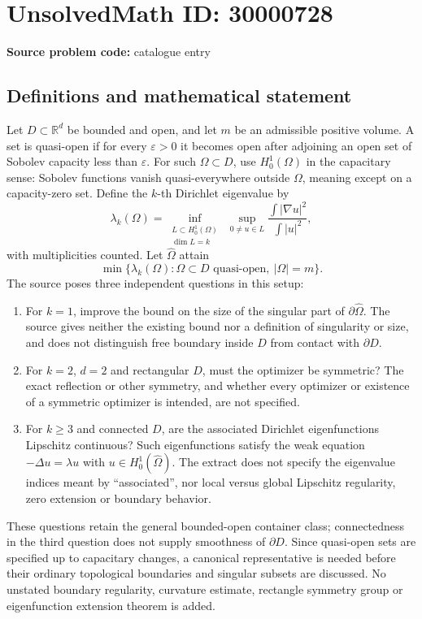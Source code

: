 \documentclass[11pt]{article}
\newcommand{\R}{\mathbb{R}}
\begin{document}
\section*{UnsolvedMath ID: 30000728}
\textbf{Source problem code:} catalogue entry
\subsection{Definitions and mathematical statement}
Let $D\subset\R^d$ be bounded and open, and let $m$ be an admissible positive volume. A set is quasi-open if for every $\varepsilon>0$ it becomes open after adjoining an open set of Sobolev capacity less than $\varepsilon$. For such $\Omega\subset D$, use $H^1_0(\Omega)$ in the capacitary sense: Sobolev functions vanish quasi-everywhere outside $\Omega$, meaning except on a capacity-zero set. Define the $k$-th Dirichlet eigenvalue by
\[
\lambda_k(\Omega)=\inf_{\substack{L\subset H^1_0(\Omega)\\\dim L=k}}
\ \sup_{0\ne u\in L}\frac{\int|\nabla u|^2}{\int|u|^2},
\]
with multiplicities counted. Let $\widehat\Omega$ attain
\[
\min\{\lambda_k(\Omega):\Omega\subset D\text{ quasi-open},\ |\Omega|=m\}.
\]
The source poses three independent questions in this setup:
\begin{enumerate}
\item For $k=1$, improve the bound on the size of the singular part of $\partial\widehat\Omega$. The source gives neither the existing bound nor a definition of singularity or size, and does not distinguish free boundary inside $D$ from contact with $\partial D$.
\item For $k=2$, $d=2$ and rectangular $D$, must the optimizer be symmetric? The exact reflection or other symmetry, and whether every optimizer or existence of a symmetric optimizer is intended, are not specified.
\item For $k\geq3$ and connected $D$, are the associated Dirichlet eigenfunctions Lipschitz continuous? Such eigenfunctions satisfy the weak equation $-\Delta u=\lambda u$ with $u\in H^1_0(\widehat\Omega)$. The extract does not specify the eigenvalue indices meant by ``associated'', nor local versus global Lipschitz regularity, zero extension or boundary behavior.
\end{enumerate}
These questions retain the general bounded-open container class; connectedness in the third question does not supply smoothness of $\partial D$. Since quasi-open sets are specified up to capacitary changes, a canonical representative is needed before their ordinary topological boundaries and singular subsets are discussed. No unstated boundary regularity, curvature estimate, rectangle symmetry group or eigenfunction extension theorem is added.
\end{document}
